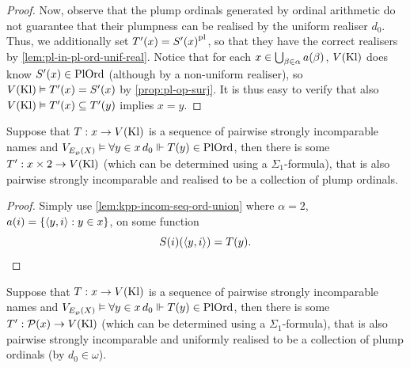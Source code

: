 \documentclass[12pt,openany]{book}
\theoremstyle{plain}
\theoremstyle{definition}
\newcommand\uppar[1]{{\upshape(}#1{\upshape)}}
\newcommand\tuple[1]{\left\langle #1 \right\rangle}
\newcommand\opA[1]{\mathop{\forall #1}}
\newcommand\Pow{\mathcal{P}}
\newcommand\PlOrd{\mathrm{PlOrd}}
\newcommand\Kl{\mathrm{Kl}}
\newcommand\pl{\mathrm{pl}}
\begin{document}
\begin{proof}
  Now, observe that the plump ordinals generated by ordinal arithmetic do not guarantee that their plumpness can be realised by the uniform realiser $d_0$. Thus, we additionally set $T'\mleft(x\mright) = S'\mleft(x\mright)^\pl$, so that they have the correct realisers by \autoref{lem:pl-in-pl-ord-unif-real}. Notice that for each $x \in \bigcup_{\beta \in \alpha} a\mleft(\beta\mright)$, $V\mleft(\Kl\mright)$ does know $S'\mleft(x\mright) \in \PlOrd$ (although by a non-uniform realiser), so $V\mleft(\Kl\mright) \vDash T'\mleft(x\mright) = S'\mleft(x\mright)$ by \autoref{prop:pl-op-surj}. It is thus easy to verify that also $V\mleft(\Kl\mright) \vDash T'\mleft(x\mright) \subseteq T'\mleft(y\mright)$ implies $x = y$.
\end{proof}

\begin{corollary}
  \label{cor:kpp-incom-seq-times-2}
  Suppose that $T : x \rightarrow V\mleft(\Kl\mright)$ is a sequence of pairwise strongly incomparable names and $V_{E_\wp\mleft(X\mright)} \vDash \opA{y \in x} d_0 \Vdash T\mleft(y\mright) \in \PlOrd$, then there is some $T' : x \times 2 \rightarrow V\mleft(\Kl\mright)$ \uppar{which can be determined using a $\Sigma_1$-formula}, that is also pairwise strongly incomparable and realised to be a collection of plump ordinals.
\end{corollary}

\begin{proof}
  Simply use \autoref{lem:kpp-incom-seq-ord-union} where $\alpha = 2$, $a\mleft(i\mright) = \left\{\tuple{y, i} : y \in x\right\}$, on some function
  \[S\mleft(i\mright)\mleft(\tuple{y, i}\mright) = T\mleft(y\mright). \qedhere\]
\end{proof}

\begin{lemma}
  \label{lem:kpp-incom-seq-pow}
  Suppose that $T : x \rightarrow V\mleft(\Kl\mright)$ is a sequence of pairwise strongly incomparable names and $V_{E_\wp\mleft(X\mright)} \vDash \opA{y \in x} d_0 \Vdash T\mleft(y\mright) \in \PlOrd$, then there is some $T' : \Pow\mleft(x\mright) \rightarrow V\mleft(\Kl\mright)$ \uppar{which can be determined using a $\Sigma_1$-formula}, that is also pairwise strongly incomparable and uniformly realised to be a collection of plump ordinals \uppar{by $d_0 \in \omega$}.
\end{lemma}
\end{document}
